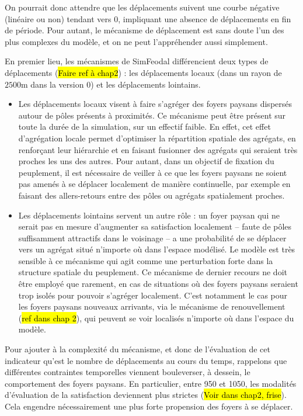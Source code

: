 On pourrait donc attendre que les déplacements suivent une courbe négative (linéaire ou non) tendant vers 0, impliquant une absence de déplacements en fin de période.
Pour autant, le mécanisme de déplacement est sans doute l'un des plus complexes du modèle, et on ne peut l'appréhender aussi simplement.

En premier lieu, les mécanismes de SimFeodal différencient deux types de déplacements (\hl{Faire ref à chap2}) :
les déplacements locaux (dans un rayon de $2500$m dans la version 0) et les déplacements lointains.

\begin{itemize}
\item Les déplacements locaux visent à faire s'agréger des foyers paysans dispersés autour de pôles présents à proximités.
Ce mécanisme peut être présent sur toute la durée de la simulation, sur un effectif faible.
En effet, cet effet d'agrégation locale permet \og d'optimiser\fg{} la répartition spatiale des agrégats, en renforçant leur hiérarchie et en faisant fusionner des agrégats qui seraient très proches les uns des autres.
Pour autant, dans un objectif de fixation du peuplement, il est nécessaire de veiller à ce que les foyers paysans ne soient pas amenés à se déplacer localement de manière continuelle, par exemple en faisant des allers-retours entre des pôles ou agrégats spatialement proches.

\item Les déplacements lointains servent un autre rôle :
un foyer paysan qui ne serait pas en mesure d'augmenter sa satisfaction localement -- faute de pôles suffisamment attractifs dans le voisinage -- a une probabilité de se déplacer vers un agrégat situé n'importe où dans l'espace modélisé.
Le modèle est très sensible à ce mécanisme qui agit comme une perturbation forte dans la structure spatiale du peuplement.
Ce mécanisme \og de dernier recours\fg{} ne doit être employé que rarement, en cas de situations où des foyers paysans seraient trop isolés pour pouvoir s'agréger localement.
C'est notamment le cas pour les foyers paysans nouveaux arrivants, via le mécanisme de renouvellement (\hl{ref dans chap 2}), qui peuvent se voir localisés n'importe où dans l'espace du modèle.
\end{itemize}

Pour ajouter à la complexité du mécanisme, et donc de l'évaluation de cet indicateur qu'est le nombre de déplacements au cours du temps, rappelons que différentes contraintes temporelles viennent bouleverser, à dessein, le comportement des foyers paysans.
En particulier, entre 950 et 1050, les modalités d'évaluation de la satisfaction deviennent plus strictes (\hl{Voir dans chap2, frise}).
Cela engendre nécessairement une plus forte propension des foyers à se déplacer.

